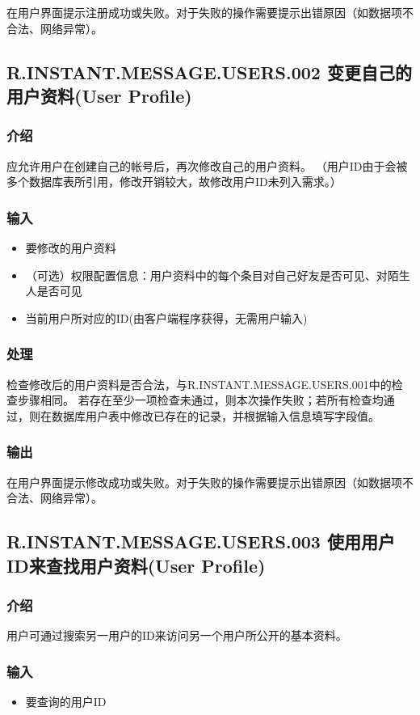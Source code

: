 在用户界面提示注册成功或失败。对于失败的操作需要提示出错原因（如数据项不合法、网络异常）。

\subsection{R.INSTANT.MESSAGE.USERS.002 变更自己的用户资料(User Profile)}
\subsubsection{介绍}
应允许用户在创建自己的帐号后，再次修改自己的用户资料。
（用户ID由于会被多个数据库表所引用，修改开销较大，故修改用户ID未列入需求。）

\subsubsection{输入}
\begin{itemize}
	\item 要修改的用户资料
	\item （可选）权限配置信息：用户资料中的每个条目对自己好友是否可见、对陌生人是否可见
	\item 当前用户所对应的ID(由客户端程序获得，无需用户输入)
	\end{itemize}
\subsubsection{处理}
检查修改后的用户资料是否合法，与R.INSTANT.MESSAGE.USERS.001中的检查步骤相同。
若存在至少一项检查未通过，则本次操作失败；若所有检查均通过，则在数据库用户表中修改已存在的记录，并根据输入信息填写字段值。
\subsubsection{输出}
在用户界面提示修改成功或失败。对于失败的操作需要提示出错原因（如数据项不合法、网络异常）。

\subsection{R.INSTANT.MESSAGE.USERS.003 使用用户ID来查找用户资料(User Profile)}
\subsubsection{介绍}
用户可通过搜索另一用户的ID来访问另一个用户所公开的基本资料。
\subsubsection{输入}
\begin{itemize}
	\item 要查询的用户ID
	\end{itemize}
